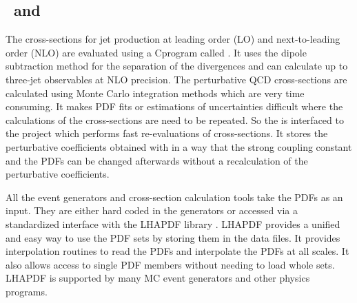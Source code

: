 \subsection{\NLOJET~and \fastNLO}
\label{Sec:NLO}
The cross-sections for jet production at leading order (LO) and next-to-leading order (NLO) are evaluated using a C\plusn\plus program called \NLOJETPP \cite{Nagy:2001fj,Nagy:2003tz}. It uses the dipole subtraction method for the separation of the divergences and can calculate up to three-jet observables at NLO precision. The perturbative QCD cross-sections are calculated using Monte Carlo integration methods which are very time consuming. It makes PDF fits or estimations of uncertainties difficult where the calculations of the cross-sections are need to be repeated. So the \NLOJETPP is interfaced to the \fastNLO project \cite{Kluge:2006xs,Britzger:2012bs} which performs fast re-evaluations of cross-sections. It stores the perturbative coefficients obtained with \NLOJETPP in a way that the strong coupling constant and the PDFs can be changed afterwards without a recalculation of the perturbative coefficients.

All the event generators and cross-section calculation tools take the PDFs as an input. They are either hard coded in the generators or accessed via a standardized interface with the LHAPDF library \cite{Whalley:2005nh,Buckley:2014ana}. LHAPDF provides a unified and easy way to use the PDF sets by storing them in the data files. It provides interpolation routines to read the PDFs and interpolate the PDFs at all scales. It also allows access to single PDF members without needing to load whole sets. LHAPDF is supported by many MC event generators and other physics programs.

